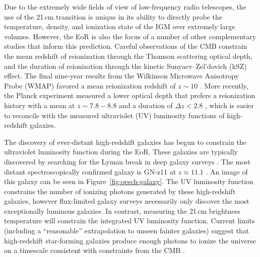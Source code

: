 \begin{bibunit}
Due to the extremely wide fields of view of low-frequency radio telescopes, the use of the 21\,cm
transition is unique in its ability to directly probe the temperature, density, and ionization state
of the IGM over extremely large volumes. However, the EoR is also the focus of a number of other
complementary studies that inform this prediction. Careful observations of the CMB constrain the
mean redshift of reionization through the Thomson scattering optical depth, and the duration of
reionization through the kinetic Sunyaev--Zel'dovich (kSZ) effect. The final nine-year results from
the Wilkinson Microwave Anisotropy Probe (WMAP) favored a mean reionization redshift of $z\sim10$
\citep{2013ApJS..208...19H}. More recently, the Planck experiment measured a lower optical depth
that prefers a reionization history with a mean at $z\sim7.8-8.8$ and a duration of $\Delta z < 2.8$
\citep{2016A&A...596A.108P}, which is easier to reconcile with the measured ultraviolet (UV)
luminosity functions of high-redshift galaxies.

The discovery of ever-distant high-redshift galaxies has begun to constrain the ultraviolet
luminosity function during the EoR. These galaxies are typically discovered by searching for the
Lyman break in deep galaxy surveys \citep[pioneered by][]{1996ApJ...462L..17S}.  The most distant
spectroscopically confirmed galaxy is GN-z11 at $z\approx 11.1$ \citep{2016ApJ...819..129O}. An
image of this galaxy can be seen in Figure~\ref{fig:oesch-galaxy}.  The UV luminosity function
constrains the number of ionizing photons generated by these high-redshift galaxies, however
flux-limited galaxy surveys necessarily only discover the most exceptionally luminous galaxies. In
contrast, measuring the 21\,cm brightness temperature will constrain the integrated UV luminosity
function.  Current limits (including a ``reasonable'' extrapolation to unseen fainter galaxies)
suggest that high-redshift star-forming galaxies produce enough photons to ionize the universe on a
timescale consistent with constraints from the CMB \citep{2015ApJ...802L..19R}.


\end{bibunit}
